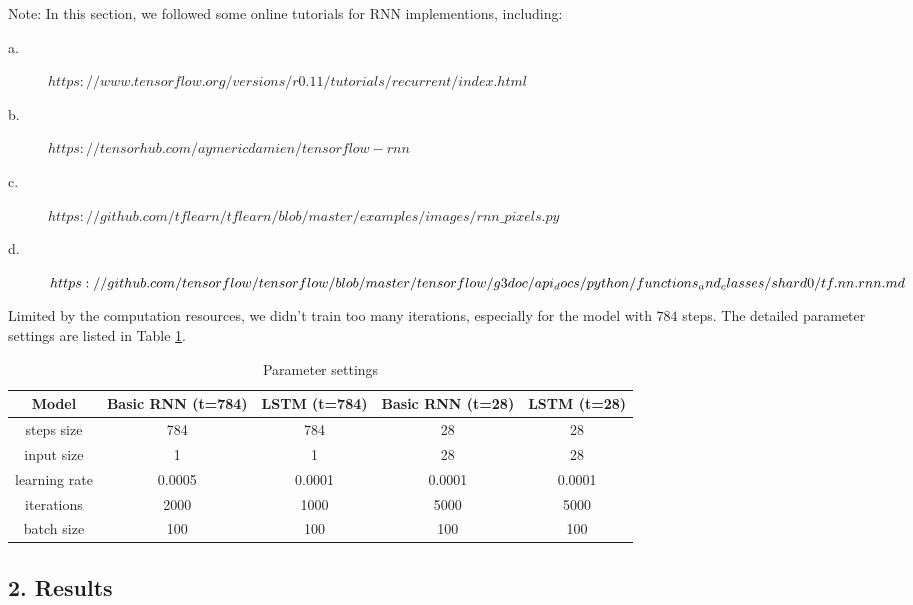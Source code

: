 \begin{description}
Note: In this section, we followed some online tutorials for RNN implementions, including:
	\begin{description}
	\item[a.]$https://www.tensorflow.org/versions/r0.11/tutorials/recurrent/index.html$
	\item[b.]$https://tensorhub.com/aymericdamien/tensorflow-rnn$
	\item[c.]$https://github.com/tflearn/tflearn/blob/master/examples/images/rnn\_pixels.py$
	\item[d.]$https://github.com/tensorflow/tensorflow/blob/master/tensorflow/g3doc/api_docs/\\
				python/functions_and_classes/shard0/tf.nn.rnn.md$
	\end{description}

\item[(2) ] Limited by the computation resources, we didn't train too many iterations, especially for the model with $784$ steps. The detailed parameter settings are listed in Table \ref{table:parameter}.
\begin{table}[H]
	\centering
	\caption{Parameter settings}
	\label{table:parameter}	
	\begin{tabular}{c | c | c | c | c}
		\hline \hline
		Model 		  &	Basic RNN (t=784) & LSTM (t=784) &	Basic RNN (t=28) & LSTM (t=28) \\[0.1cm]
		\hline
		steps size	  &	784			  &	784			 	 &	28			 	 & 28 	 	   \\[0.1cm]
		input size	  &	1			  &	1			 	 &	28			     & 28		   \\[0.1cm]
		learning rate &	0.0005		  &	0.0001		 	 &	0.0001 		     & 0.0001	   \\[0.1cm]
		iterations	  &	2000		  &	1000		  	 &	5000 		     & 5000        \\[0.1cm]
		batch size	  &	100			  &	100			 	 &	100			     & 100		   \\[0.1cm]
		\hline	
	\end{tabular}
\end{table}
\end{description}

\newpage
\subsection*{\large 2. Results}

